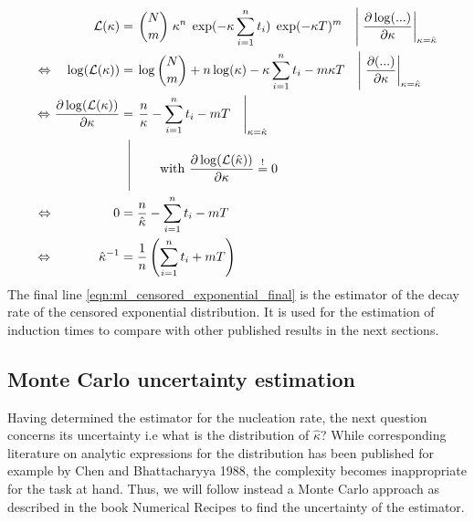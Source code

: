 \begin{align}
\label{eqn:ml_censored_exponential} 
\mathcal{L}(\kappa) & = \left. \binom{N}{m} \;  \kappa^n \; \exp(- \kappa \sum_{i=1}^n t_i) \;  \exp(-\kappa T)^m \quad \right| \left.\frac{\partial \log ( ... )}{\partial \kappa} \right|_{\kappa=\hat{\kappa}} \\
\Leftrightarrow \quad\log ( \mathcal{L}(\kappa)) & = \left.\log\binom{N}{m}  + n \log ( \kappa) - \kappa \sum_{i=1}^n t_i - m \kappa T \quad \right| \left. \frac{\partial(...)}{\partial \kappa} \right|_{\kappa=\hat{\kappa}} \\
\Leftrightarrow \:\! \frac{\partial \log ( \mathcal{L}(\kappa))}{\partial \kappa} & = \left. \frac{n}{ \kappa} - \sum_{i=1}^n t_i - m  T \quad \right|_{\kappa=\hat{\kappa}}\\ 
 & \; \; \, \vrule
  \begin{aligned}[t]
      \raisebox{0.9cm}{ \makebox[0.1cm]{}} \raisebox{-0.5cm}{ \makebox[0.5cm]{}}  \text{with } \frac{\partial \log ( \mathcal{L}(\hat{\kappa})  )}{\partial \kappa}  \stackrel{!}{=} 0  \\
  \end{aligned} \nonumber\\
\Leftrightarrow \qquad\qquad \;\; \:\! 0 &= \frac{n}{ \hat{\kappa}} - \sum_{i=1}^n t_i - m  T \quad\\
\label{eqn:ml_censored_exponential_final}
 \Leftrightarrow \qquad\quad  \;\: \hat{\kappa}^{-1} &= \frac{1}{n} \left(  \sum_{i=1}^n t_i + m T \right)
\end{align}
The final line \autoref{eqn:ml_censored_exponential_final} is the estimator of the decay rate of the censored exponential distribution. It is used for the estimation of induction times to compare with other published results in the next sections.

\subsection{Monte Carlo uncertainty estimation}
\label{sec:mc_uncertainty}
Having determined the estimator for the nucleation rate, the next question concerns its uncertainty i.e what is the distribution of $\hat{\kappa}$? While corresponding literature on analytic expressions for the distribution has been published for example by Chen and Bhattacharyya 1988\cite{Chen1988}, the complexity becomes inappropriate for the task at hand. Thus, we will follow instead a Monte Carlo approach as described in the book Numerical Recipes\cite{Press1992} to find the uncertainty of the estimator.\\

